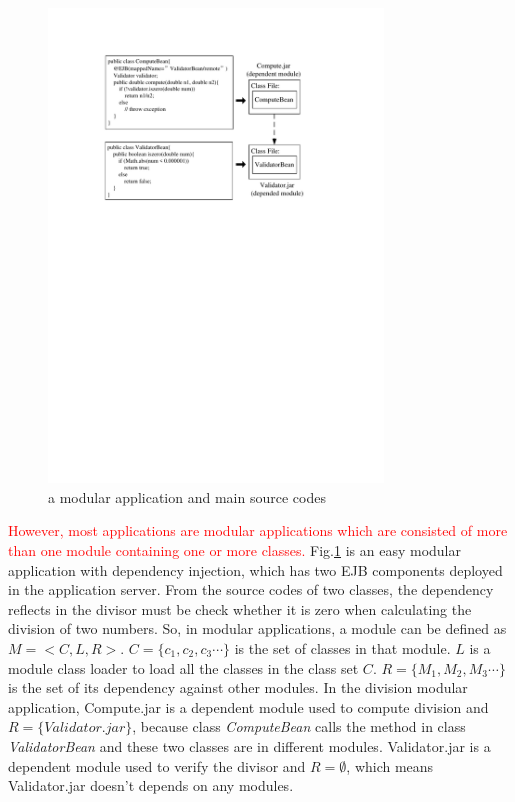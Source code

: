\documentclass[conference]{IEEEtran}
\begin{document}
\begin{figure}[ht]
\centering
\includegraphics[width=3.5in]{ExampleEJB.pdf}
\caption{a modular application and main source codes}
\label{fig:example}
\end{figure}

\textcolor{red}{However, most applications are modular applications which are consisted of more than one module containing one or more classes.
}Fig.\ref{fig:example} is an easy modular application with dependency injection\cite{DI}, which has two EJB\cite{EJB} components deployed in the application server.
From the source codes of two classes, the dependency reflects in the divisor must be check whether it is zero when calculating the division of two numbers.
So, in modular applications, a module can be defined as $M=<C, L, R>$. 
$C=\{c_1, c_2, c_3\cdots\}$ is the set of classes in that module. 
$L$ is a module class loader to load all the classes in the class set $C$.
$R=\{M_1, M_2, M_3\cdots\}$ is the set of its dependency against other modules. 
In the division modular application, Compute.jar is a dependent module used to compute division and $R = \{Validator.jar\}$, because class \emph{ComputeBean} calls the method in class \emph{ValidatorBean} and these two classes are in different modules.
Validator.jar is a dependent module used to verify the divisor and $R = \emptyset$, which means Validator.jar doesn’t depends on any modules.
\end{document}
